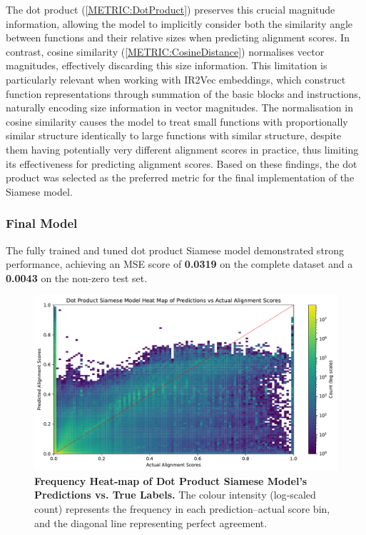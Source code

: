 The dot product (\ref{METRIC:DotProduct}) preserves this crucial magnitude information, allowing the model to implicitly consider both the similarity angle between functions and their relative sizes when predicting alignment scores. In contrast, cosine similarity (\ref{METRIC:CosineDistance}) normalises vector magnitudes, effectively discarding this size information. This limitation is particularly relevant when working with IR2Vec embeddings, which construct function representations through summation of the basic blocks and instructions, naturally encoding size information in vector magnitudes. The normalisation in cosine similarity causes the model to treat small functions with proportionally similar structure identically to large functions with similar structure, despite them having potentially very different alignment scores in practice, thus limiting its effectiveness for predicting alignment scores. Based on these findings, the dot product was selected as the preferred metric for the final implementation of the Siamese model.


\subsubsection{Final Model}
The fully trained and tuned dot product Siamese model demonstrated strong performance, achieving an MSE score of \textbf{0.0319} on the complete dataset and a \textbf{0.0043} on the non-zero test set.

\begin{figure}[tbh!]
\centering
\includegraphics[scale=0.65]{Figures/Dot_Product_Siamese_Model_Heatmap.pdf}
\caption{\textbf{Frequency Heat‑map of Dot Product Siamese Model's Predictions vs. True Labels.} The colour intensity (log‑scaled count) represents the frequency in each prediction–actual score bin, and the diagonal line representing perfect agreement.} 
\label{fig:SiameseModelHeatmap}
\end{figure}

